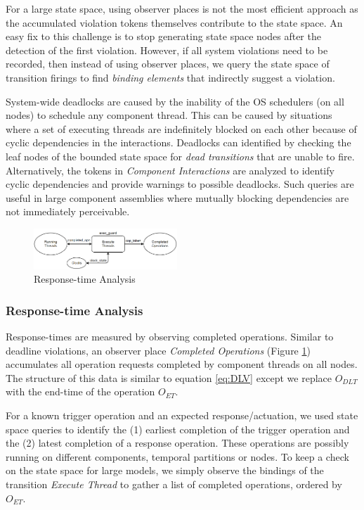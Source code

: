 For a large state space, using observer places is not the most efficient approach as the accumulated violation tokens themselves contribute to the state space. An easy fix to this challenge is to stop generating state space nodes after the detection of the first violation. However, if all system violations need to be recorded, then instead of using observer places, we query the state space of transition firings to find \emph{binding elements} that indirectly suggest a violation.

System-wide deadlocks are caused by the inability of the OS schedulers (on all nodes) to schedule any component thread. This can be caused by situations where a set of executing threads are indefinitely blocked on each other because of cyclic dependencies in the interactions. Deadlocks can identified by checking the leaf nodes of the bounded state space for \emph{dead transitions} that are unable to fire. Alternatively, the tokens in \emph{Component Interactions} are analyzed to identify cyclic dependencies and provide warnings to possible deadlocks. Such queries are useful in large component assemblies where mutually blocking dependencies are not immediately perceivable. 

\begin{figure}[htb]
	\centering
	\includegraphics[width=0.48\textwidth]{figs/Response_Times.png}
	\caption{Response-time Analysis}
	\label{fig:COP}
\end{figure}

\subsubsection{Response-time Analysis}

Response-times are measured by observing completed operations. Similar to deadline violations, an observer place \emph{Completed Operations} (Figure \ref{fig:COP}) accumulates all operation requests completed by component threads on all nodes. The structure of this data is similar to equation \ref{eq:DLV} except we replace $O_{DLT}$ with the end-time of the operation $O_{ET}$.

For a known trigger operation and an expected response/actuation, we used state space queries to identify the (1) earliest completion of the trigger operation and the (2) latest completion of a response operation. These operations are possibly running on different components, temporal partitions or nodes. To keep a check on the state space for large models, we simply observe the bindings of the transition \emph{Execute Thread} to gather a list of completed operations, ordered by $O_{ET}$.

